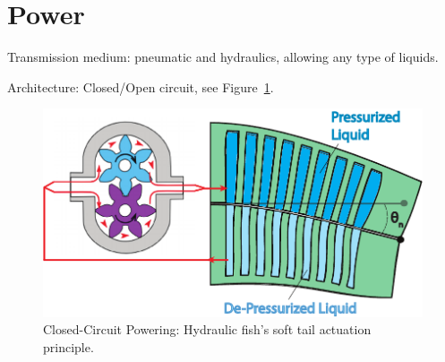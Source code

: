 \section{Power}
\label{sec:Power}

Transmission medium: pneumatic and hydraulics, allowing any type of liquids.

Architecture: Closed/Open circuit, see Figure~\ref{fig:tail_actuation_principle}.

\begin{figure}[htb]
        \centering
            \includegraphics[width=0.85\columnwidth]{figures/power/fish_actuation_principle.pdf}
        \caption[Fish's soft tail actuation principle]{Closed-Circuit Powering: Hydraulic fish's soft tail actuation principle.}
            \label{fig:tail_actuation_principle}
\end{figure}
